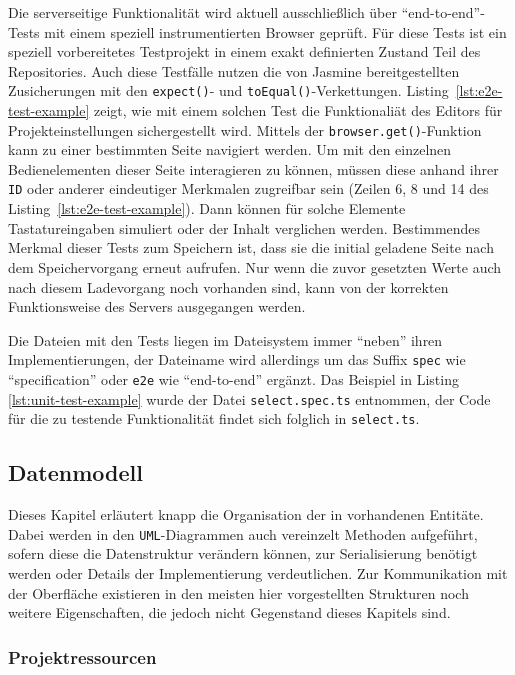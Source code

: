 Die serverseitige Funktionalität wird aktuell ausschließlich über "`end-to-end"'-Tests mit einem speziell instrumentierten Browser geprüft. Für diese Tests ist ein speziell vorbereitetes Testprojekt in einem exakt definierten Zustand Teil des Repositories. Auch diese Testfälle nutzen die von Jasmine bereitgestellten Zusicherungen mit den \texttt{expect()}- und \texttt{toEqual()}-Verkettungen. Listing~\ref{lst:e2e-test-example} zeigt, wie mit einem solchen Test die Funktionaliät des Editors für Projekteinstellungen sichergestellt wird. Mittels der \texttt{browser.get()}-Funktion kann zu einer bestimmten Seite navigiert werden. Um mit den einzelnen Bedienelementen dieser Seite interagieren zu können, müssen diese anhand ihrer \texttt{ID} oder anderer eindeutiger Merkmalen zugreifbar sein (Zeilen 6, 8 und 14 des Listing~\ref{lst:e2e-test-example}). Dann können für solche Elemente Tastatureingaben simuliert oder der Inhalt verglichen werden. Bestimmendes Merkmal dieser Tests zum Speichern ist, dass sie die initial geladene Seite nach dem Speichervorgang erneut aufrufen. Nur wenn die zuvor gesetzten Werte auch nach diesem Ladevorgang noch vorhanden sind, kann von der korrekten Funktionsweise des Servers ausgegangen werden.

Die Dateien mit den Tests liegen im Dateisystem immer "`neben"' ihren Implementierungen, der Dateiname wird allerdings um das Suffix \texttt{spec} wie "`specification"' oder \texttt{e2e} wie "`end-to-end"' ergänzt. Das Beispiel in Listing  \ref{lst:unit-test-example} wurde der Datei \texttt{select.spec.ts} entnommen, der Code für die zu testende Funktionalität findet sich folglich in \texttt{select.ts}.

\subsection{Datenmodell}

Dieses Kapitel erläutert knapp die Organisation der in \idename{} vorhandenen Entitäte. Dabei werden in den \texttt{UML}-Diagrammen auch vereinzelt Methoden aufgeführt, sofern diese die Datenstruktur verändern können, zur Serialisierung benötigt werden oder Details der Implementierung verdeutlichen. Zur Kommunikation mit der Oberfläche existieren in den meisten hier vorgestellten Strukturen noch weitere Eigenschaften, die jedoch nicht Gegenstand dieses Kapitels sind.

\subsubsection{Projektressourcen}

